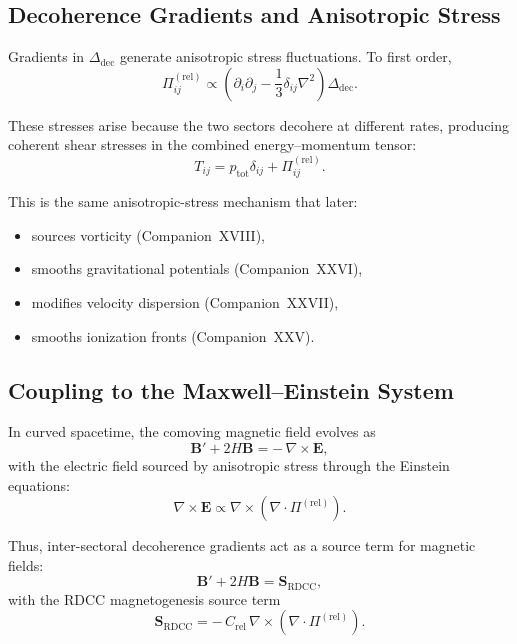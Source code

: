 \documentclass[11pt,a4paper]{article}
\begin{document}
\subsection{Decoherence Gradients and Anisotropic Stress}

Gradients in $\Delta_{\mathrm{dec}}$ generate anisotropic stress fluctuations. To first order,
\begin{equation}
\Pi^{(\mathrm{rel})}_{ij}
\propto
\left(
\partial_{i}\partial_{j}
-
\frac{1}{3}\delta_{ij}\nabla^{2}
\right)
\Delta_{\mathrm{dec}}.
\end{equation}

These stresses arise because the two sectors decohere at different rates, producing coherent
shear stresses in the combined energy–momentum tensor:
\begin{equation}
T_{ij}
=
p_{\mathrm{tot}}\delta_{ij}
+
\Pi^{(\mathrm{rel})}_{ij}.
\end{equation}

This is the same anisotropic-stress mechanism that later:
\begin{itemize}
\item sources vorticity (Companion~XVIII),
\item smooths gravitational potentials (Companion~XXVI),
\item modifies velocity dispersion (Companion~XXVII),
\item smooths ionization fronts (Companion~XXV).
\end{itemize}

\subsection{Coupling to the Maxwell–Einstein System}

In curved spacetime, the comoving magnetic field evolves as
\begin{equation}
\mathbf{B}' + 2H\mathbf{B}
=
-\,\nabla \times \mathbf{E},
\end{equation}
with the electric field sourced by anisotropic stress through the Einstein equations:
\begin{equation}
\nabla \times \mathbf{E}
\propto
\nabla \times \left( \nabla \cdot \Pi^{(\mathrm{rel})} \right).
\end{equation}

Thus, inter-sectoral decoherence gradients act as a source term for magnetic fields:
\begin{equation}
\mathbf{B}' + 2H\mathbf{B}
=
\mathbf{S}_{\mathrm{RDCC}},
\end{equation}
with the RDCC magnetogenesis source term
\begin{equation}
\mathbf{S}_{\mathrm{RDCC}}
=
-\,C_{\mathrm{rel}}\,
\nabla \times
\left(
\nabla \cdot \Pi^{(\mathrm{rel})}
\right).
\end{equation}
\end{document}
